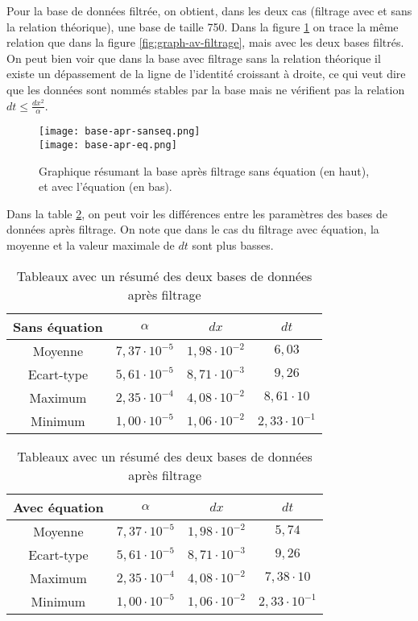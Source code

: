 \documentclass[a4paper,12pt,french]{article}
\begin{document}
Pour la base de données filtrée, on obtient, dans les deux cas (filtrage avec et sans la relation théorique), une base de taille 750. Dans la figure \ref{fig:graph-apr-filtrage} on trace la même relation que dans la figure \ref{fig:graph-av-filtrage}, mais avec les deux bases filtrés. On peut bien voir que dans la base avec filtrage sans la relation théorique il existe un dépassement de la ligne de l'identité croissant à droite, ce qui veut dire que les données sont nommés stables par la base mais ne vérifient pas la relation $dt\leq \frac{dx^2}{\alpha}$. 
\\

\begin{figure}[ht!]
    \centering
    \texttt{[image: base-apr-sanseq.png]}
    \\
    \texttt{[image: base-apr-eq.png]}
    \caption{Graphique résumant la base après filtrage sans équation (en haut), et avec l'équation (en bas).}
    \label{fig:graph-apr-filtrage}
\end{figure}

Dans la table \ref{tab:apresfiltre}, on peut voir les différences entre les paramètres des bases de données après filtrage. On note que dans le cas du filtrage avec équation, la moyenne et la valeur maximale de $dt$ sont plus basses.
\\

\begin{table}
\centering
\begin{tabular}{|c|c|c|c|}
\hline 
Sans équation & $\alpha$ & $dx$ & $dt$ \\ 
\hline 
Moyenne & $7,37\cdot 10^{-5}$ & $1,98\cdot 10^{-2}$ & $6,03$ \\ 
\hline 
Ecart-type & $5,61\cdot 10^{-5}$ & $8,71\cdot 10^{-3}$ & $9,26 $\\ 
\hline 
Maximum & $2,35\cdot 10^{-4}$ & $4,08\cdot 10^{-2}$ & $8,61\cdot 10$ \\ 
\hline 
Minimum & $1,00\cdot 10^{-5}$ & $1,06\cdot 10^{-2}$ & $2,33\cdot 10^{-1}$ \\ 
\hline 
\end{tabular}

\begin{tabular}{|c|c|c|c|}
\hline 
Avec équation & $\alpha$ & $dx$ & $dt$ \\ 
\hline 
Moyenne & $7,37\cdot 10^{-5}$ & $1,98\cdot 10^{-2}$ & $5,74$ \\ 
\hline 
Ecart-type & $5,61\cdot 10^{-5}$ & $8,71\cdot 10^{-3}$ & $9,26 $\\ 
\hline 
Maximum & $2,35\cdot 10^{-4}$ & $4,08\cdot 10^{-2}$ & $7,38\cdot 10$ \\ 
\hline 
Minimum & $1,00\cdot 10^{-5}$ & $1,06\cdot 10^{-2}$ & $2,33\cdot 10^{-1}$ \\ 
\hline 
\end{tabular}
\caption{Tableaux avec un résumé des deux bases de données après filtrage}
\label{tab:apresfiltre}
\end{table}
\end{document}
